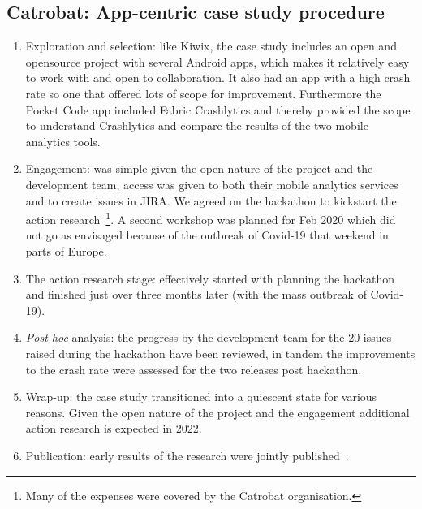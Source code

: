 \subsection{Catrobat: App-centric case study procedure}
{\small
\begin{enumerate}
    \itemsep0em
    \item Exploration and selection: like Kiwix, the case study includes an open and opensource project with several Android apps, which makes it relatively easy to work with and open to collaboration. It also had an app with a high crash rate so one that offered lots of scope for improvement. Furthermore the Pocket Code app included Fabric Crashlytics and thereby provided the scope to understand Crashlytics and compare the results of the two mobile analytics tools. 
    \item Engagement: was simple given the open nature of the project and the development team, access was given to both their mobile analytics services and to create issues in JIRA. We agreed on the hackathon to kickstart the action research~\footnote{Many of the expenses were covered by the Catrobat organisation.}. A second workshop was planned for  Feb 2020 which did not go as envisaged because of the outbreak of Covid-19 that weekend in parts of Europe.
    \item The action research stage: effectively started with planning the hackathon and finished just over three months later (with the mass outbreak of Covid-19).
    \item \textit{Post-hoc} analysis: the progress by the development team for the 20 issues raised during the hackathon have been reviewed, in tandem the improvements to the crash rate were assessed for the two releases post hackathon.
    \item Wrap-up: the case study transitioned into a quiescent state for various reasons. Given the open nature of the project and the engagement additional action research is expected in 2022.
    \item Publication: early results of the research were jointly published~\citep{harty_better_android_apps_using_android_vitals}.
\end{enumerate}
}


